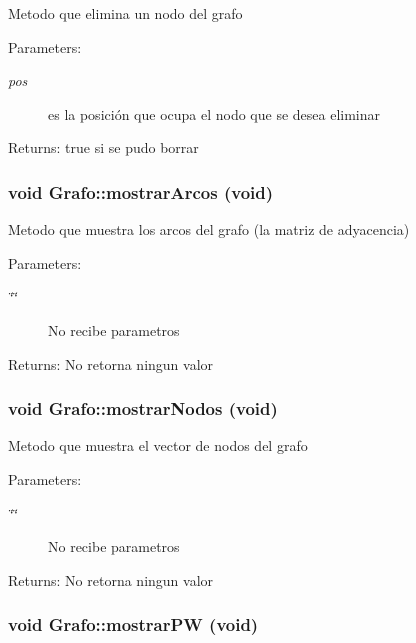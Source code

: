 Metodo que elimina un nodo del grafo \begin{Desc}
\item[Parameters:]
\begin{description}
\item[{\em pos}]es la posición que ocupa el nodo que se desea eliminar \end{description}
\end{Desc}
\begin{Desc}
\item[Returns:]true si se pudo borrar \end{Desc}
\hypertarget{classGrafo_44f6f4aca2763cfae2da60a489692423}{
\subsubsection[mostrarArcos]{\setlength{\rightskip}{0pt plus 5cm}void Grafo::mostrarArcos (void)}}
\label{classGrafo_44f6f4aca2763cfae2da60a489692423}


Metodo que muestra los arcos del grafo (la matriz de adyacencia) \begin{Desc}
\item[Parameters:]
\begin{description}
\item[{\em \char`\"{}\char`\"{}}]No recibe parametros \end{description}
\end{Desc}
\begin{Desc}
\item[Returns:]No retorna ningun valor \end{Desc}
\hypertarget{classGrafo_84b7da0227f81b94681bc3cb629f3035}{
\subsubsection[mostrarNodos]{\setlength{\rightskip}{0pt plus 5cm}void Grafo::mostrarNodos (void)}}
\label{classGrafo_84b7da0227f81b94681bc3cb629f3035}


Metodo que muestra el vector de nodos del grafo \begin{Desc}
\item[Parameters:]
\begin{description}
\item[{\em \char`\"{}\char`\"{}}]No recibe parametros \end{description}
\end{Desc}
\begin{Desc}
\item[Returns:]No retorna ningun valor \end{Desc}
\hypertarget{classGrafo_4c7af7b8f7cb4423836f45dd62d9fff2}{
\subsubsection[mostrarPW]{\setlength{\rightskip}{0pt plus 5cm}void Grafo::mostrarPW (void)}}
\label{classGrafo_4c7af7b8f7cb4423836f45dd62d9fff2}


